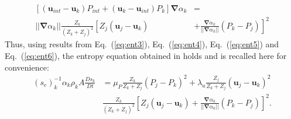 \documentclass[preprint,10pt]{elsarticle}
\newcommand{\grad}{\mbold{\nabla}}
\newcommand{\mbold}[1]{\boldsymbol#1}
\newcommand{\eqt}[1]{Eq.~(\ref{#1})}                     %
\begin{document}
\begin{appendices}
\begin{align}
\label{eq:ent6}
\left[ (\mbold u_{int}-\mbold u_k)P_{int} + (\mbold u_k-\mbold u_{int})P_k \right] \grad \alpha_k &=  \nonumber \\
|| \grad \alpha_k || \frac{Z_k }{\left( Z_k+Z_j \right)^2} \left[ Z_j (\mbold u_j-\mbold u_k)\right.&+\left.\frac{\grad \alpha_k}{|| \grad \alpha_k ||}(P_k-P_j)\right]^2
\end{align}
Thus, using results from \eqt{eq:ent3}, \eqt{eq:ent4}, \eqt{eq:ent5} and \eqt{eq:ent6}, the entropy equation obtained in \cite{SEM} holds and is recalled here for convenience:
\begin{align}
(s_{e})_k^{-1} \alpha_k \rho_k A \frac{Ds_k}{Dt} &= \mu_P \frac{Z_k}{Z_k+Z_j} (P_j - P_k)^2 + \lambda_u \frac{Z_j}{Z_k+Z_j} (\mbold u_j -\mbold  u_k)^2 \nonumber
\\
& \frac{Z_k}{\left( Z_k+Z_j \right)^2} \left[ Z_j (\mbold u_j-\mbold u_k)+\frac{\grad \alpha_k}{|| \grad \alpha_k ||}(P_k-P_j)\right]^2. \nonumber
\end{align}
\end{appendices}
\end{document}
